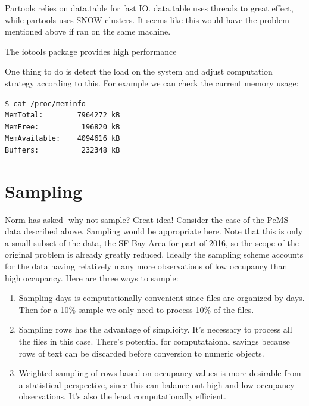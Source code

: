 \documentclass[12pt]{article}
\begin{document}
Partools relies on data.table for fast IO. data.table uses
threads to great effect, while partools uses SNOW clusters. It seems like
this would have the problem mentioned above if ran on the same machine.

The iotools package provides high performance

One thing to do is detect the load on the system and adjust computation
strategy according to
this. For example we can check the current memory usage:

\begin{verbatim}
$ cat /proc/meminfo
MemTotal:        7964272 kB
MemFree:          196820 kB
MemAvailable:    4094616 kB
Buffers:          232348 kB
\end{verbatim}

\appendix

\section{Sampling}

Norm has asked- why not sample? Great idea! Consider the case of the PeMS
data described above. Sampling would be appropriate here. Note that
this is only a small subset of the data, the SF Bay Area for part of 2016,
so the scope of the original problem is already greatly reduced. 
Ideally the sampling scheme accounts for the data having relatively many
more observations of low occupancy than high occupancy. 
Here are three ways to sample:

\begin{enumerate}

    \item Sampling days is computationally convenient since files are
        organized by days. Then for a 10\% sample we only need to process
        10\% of the files. 

    \item Sampling rows has the advantage of simplicity. It's necessary to
        process all the files in this case. There's potential for
        computataional savings because rows of text can be discarded
        before conversion to numeric objects.

    \item Weighted sampling of rows based on occupancy values is more
        desirable from a statistical perspective, since this can balance
        out high and low occupancy observations.  It's also the least
        computationally efficient.

\end{enumerate}
\end{document}
